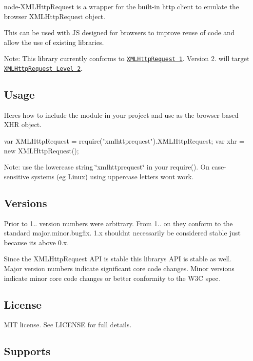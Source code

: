 node-\/\+X\+M\+L\+Http\+Request is a wrapper for the built-\/in http client to emulate the browser X\+M\+L\+Http\+Request object.

This can be used with JS designed for browsers to improve reuse of code and allow the use of existing libraries.

Note\+: This library currently conforms to \href{http://www.w3.org/TR/XMLHttpRequest/}{\tt X\+M\+L\+Http\+Request 1}. Version 2. will target \href{http://www.w3.org/TR/XMLHttpRequest2/}{\tt X\+M\+L\+Http\+Request Level 2}.

\subsection*{Usage}

Here\textquotesingle{}s how to include the module in your project and use as the browser-\/based X\+HR object. \begin{DoxyVerb}var XMLHttpRequest = require("xmlhttprequest").XMLHttpRequest;
var xhr = new XMLHttpRequest();
\end{DoxyVerb}


Note\+: use the lowercase string \char`\"{}xmlhttprequest\char`\"{} in your require(). On case-\/sensitive systems (eg Linux) using uppercase letters won\textquotesingle{}t work.

\subsection*{Versions}

Prior to 1.. version numbers were arbitrary. From 1.. on they conform to the standard major.\+minor.\+bugfix. 1.\+x shouldn\textquotesingle{}t necessarily be considered stable just because it\textquotesingle{}s above 0.\+x.

Since the X\+M\+L\+Http\+Request A\+PI is stable this library\textquotesingle{}s A\+PI is stable as well. Major version numbers indicate significant core code changes. Minor versions indicate minor core code changes or better conformity to the W3C spec.

\subsection*{License}

M\+IT license. See L\+I\+C\+E\+N\+SE for full details.

\subsection*{Supports}


